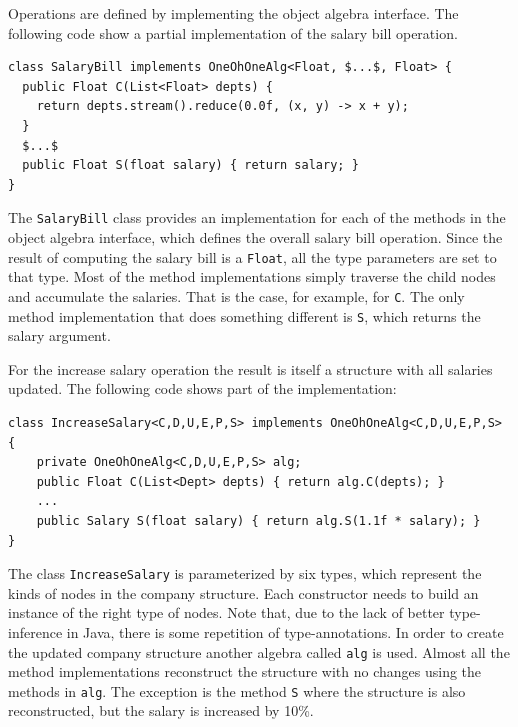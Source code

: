 Operations are defined by implementing the object algebra interface.
The following code show a partial implementation of the salary bill
operation.

\begin{lstlisting}[numbers=none,mathescape=true]
class SalaryBill implements OneOhOneAlg<Float, $...$, Float> {
  public Float C(List<Float> depts) {
    return depts.stream().reduce(0.0f, (x, y) -> x + y);
  }
  $...$
  public Float S(float salary) { return salary; }
}
\end{lstlisting}


The \lstinline{SalaryBill} class provides an implementation for each
of the methods in the object algebra interface, which defines the
overall salary bill operation. Since the result of computing the
salary bill is a \lstinline{Float}, all the type parameters are set to
that type. Most of the method implementations simply traverse the
child nodes and accumulate the salaries. That is the case, for
example, for \lstinline{C}. The only method implementation that does
something different is \lstinline{S}, which returns the salary
argument.

For the increase salary operation the result is itself a structure
with all salaries updated. The following code shows part of the
implementation:

\begin{lstlisting}[numbers=none]
class IncreaseSalary<C,D,U,E,P,S> implements OneOhOneAlg<C,D,U,E,P,S> {
	private OneOhOneAlg<C,D,U,E,P,S> alg;
	public Float C(List<Dept> depts) { return alg.C(depts); }
	...
	public Salary S(float salary) { return alg.S(1.1f * salary); }
}
\end{lstlisting}

The class \lstinline{IncreaseSalary} is parameterized by six types,
which represent the kinds of nodes in the company structure. Each
constructor needs to build an instance of the right type of nodes.
Note that, due to the lack of better type-inference in Java, there is
some repetition of type-annotations. In order to create the updated
company structure another algebra called \lstinline{alg} is used.
Almost all the method implementations reconstruct the structure with
no changes using the methods in \lstinline{alg}. The exception is the
method \lstinline{S} where the structure is also reconstructed, but
the salary is increased by 10\%.

